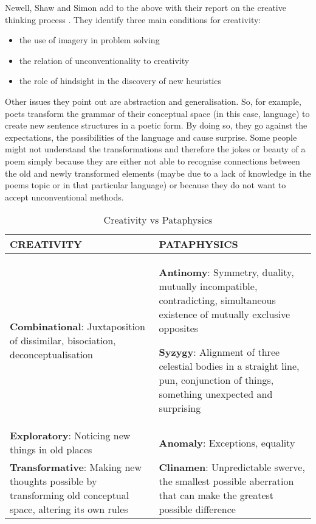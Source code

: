 \begin{leftbar}
Newell, Shaw and Simon add to the above with their report on the creative thinking process \autocite{Newell1963}. They identify three main conditions for creativity:
\end{leftbar}

\begin{itemize}
  \item the use of imagery in problem solving
  \item the relation of unconventionality to creativity
  \item the role of hindsight in the discovery of new heuristics
\end{itemize}

\begin{leftbar}
Other issues they point out are abstraction and generalisation. So, for example, poets transform the grammar of their conceptual space (in this case, language) to create new sentence structures in a poetic form. By doing so, they go against the expectations, the possibilities of the language and cause surprise. Some people might not understand the transformations and therefore the jokes or beauty of a poem simply because they are either not able to recognise connections between the old and newly transformed elements (maybe due to a lack of knowledge in the poems topic or in that particular language) or because they do not want to accept unconventional methods.
\end{leftbar}

\begin{table}[htb]
  \begin{tabu}{XX}
  \toprule
  \textbf{CREATIVITY} & \textbf{PATAPHYSICS} \\
  \midrule
  \textbf{Combinational}: Juxtaposition of dissimilar, bisociation, deconceptualisation
  &
  \textbf{Antinomy}: Symmetry, duality, mutually incompatible, contradicting, simultaneous existence of mutually exclusive opposites
  \par
  \textbf{Syzygy}: Alignment of three celestial bodies in a
  straight line, pun, conjunction of things, something unexpected
  and surprising
  \\ \midrule
  \textbf{Exploratory}: Noticing new things in old places
  &
  \textbf{Anomaly}: Exceptions, equality
  \\ \midrule
  \textbf{Transformative}: Making new thoughts possible by transforming old conceptual space, altering its own rules
  &
  \textbf{Clinamen}: Unpredictable swerve, the smallest possible aberration that can make the greatest possible difference
  \\
  \bottomrule
  \end{tabu}
\caption[Creativity vs Pataphysics]{Creativity vs Pataphysics}
\label{tab:creatpata}
\end{table}

